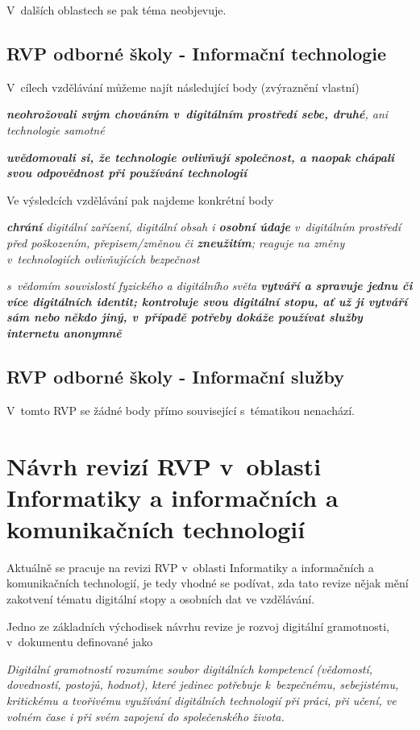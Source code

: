 V~dalších oblastech se pak téma neobjevuje. 

\subsection{RVP odborné školy - Informační technologie}

V~cílech vzdělávání můžeme najít následující body (zvýraznění vlastní)

\textit{\textbf{neohrožovali svým chováním v~digitálním prostředí sebe, druhé}, ani technologie samotné}

\textit{\textbf{uvědomovali si, že technologie ovlivňují společnost, a naopak chápali svou odpovědnost při používání technologií}}

Ve výsledcích vzdělávání pak najdeme konkrétní body

\textit{\textbf{chrání} digitální zařízení, digitální obsah i \textbf{osobní údaje} v~digitálním prostředí před poškozením, přepisem/změnou či \textbf{zneužitím}; reaguje na změny v~technologiích ovlivňujících bezpečnost}

\textit{s~vědomím souvislostí fyzického a digitálního světa \textbf{vytváří a spravuje jednu či více digitálních identit; kontroluje svou digitální stopu, ať už ji vytváří sám nebo někdo jiný, v~případě potřeby dokáže používat služby internetu anonymně}}

\subsection{RVP odborné školy - Informační služby}

V~tomto RVP se žádné body přímo související s~tématikou nenachází.

\section{Návrh revizí RVP v~oblasti Informatiky a informačních a komunikačních technologií}

Aktuálně se pracuje na revizi RVP v~oblasti Informatiky a informačních a komunikačních technologií, je tedy vhodné se podívat, zda tato revize nějak mění zakotvení tématu digitální stopy a osobních dat ve vzdělávání.

Jedno ze základních východisek návrhu revize je rozvoj digitální gramotnosti, v~dokumentu definované jako 

\textit{Digitální gramotností rozumíme soubor digitálních kompetencí (vědomostí, dovedností, postojů, hodnot), které jedinec potřebuje k bezpečnému, sebejistému, kritickému a tvořivému využívání digitálních technologií při práci, při učení, ve volném čase i při svém zapojení do společenského života.}

